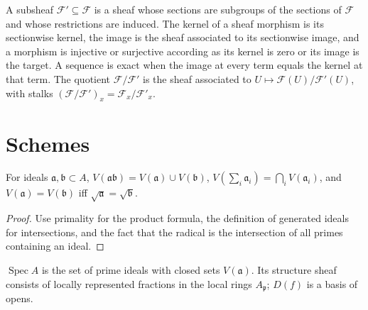 \begin{definition}
\label{def:II-1-subsheaf-exact}
A subsheaf $\mathcal F'\subseteq\mathcal F$ is a sheaf whose sections are subgroups of the
sections of $\mathcal F$ and whose restrictions are induced.  The kernel of a sheaf morphism is its
sectionwise kernel, the image is the sheaf associated to its sectionwise image, and a morphism is
injective or surjective according as its kernel is zero or its image is the target.  A sequence is
exact when the image at every term equals the kernel at that term.  The quotient $\mathcal F/\mathcal F'$
is the sheaf associated to $U\mapsto\mathcal F(U)/\mathcal F'(U)$, with stalks
$(\mathcal F/\mathcal F')_x=\mathcal F_x/\mathcal F'_x$.
\end{definition}

\section{Schemes}

\begin{lemma}
\label{lem:II-2-1}
\leanok
For ideals $\mathfrak a,\mathfrak b\subset A$,
$V(\mathfrak a\mathfrak b)=V(\mathfrak a)\cup V(\mathfrak b)$,
$V(\sum_i\mathfrak a_i)=\bigcap_iV(\mathfrak a_i)$, and
$V(\mathfrak a)=V(\mathfrak b)$ iff $\sqrt{\mathfrak a}=\sqrt{\mathfrak b}$.
\end{lemma}
\begin{proof}
Use primality for the product formula, the definition of generated ideals for intersections, and
the fact that the radical is the intersection of all primes containing an ideal.
\end{proof}

\begin{definition}
\label{def:II-2-spectrum}
\leanok
 $\operatorname{Spec}A$ is the set of prime ideals with closed sets $V(\mathfrak a)$. Its structure
sheaf consists of locally represented fractions in the local rings $A_{\mathfrak p}$; $D(f)$ is a
basis of opens.
\end{definition}


